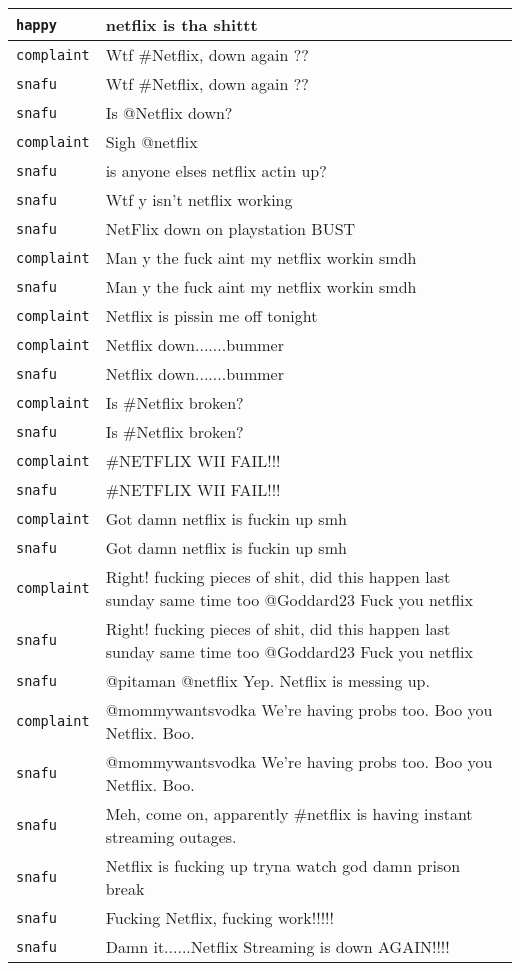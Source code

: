 \begin{center}
\begin{longtable}{|l|p{120mm}|}
         \texttt{happy} & netflix is tha shittt
      \tabularnewline\hline
         \texttt{complaint} & Wtf \#Netflix, down again ??
      \tabularnewline\hline
         \texttt{snafu} & Wtf \#Netflix, down again ??
      \tabularnewline\hline
         \texttt{snafu} & Is @Netflix down?
      \tabularnewline\hline
         \texttt{complaint} & Sigh @netflix
      \tabularnewline\hline
         \texttt{snafu} & is anyone elses netflix actin up?
      \tabularnewline\hline
         \texttt{snafu} & Wtf y isn't netflix working
      \tabularnewline\hline
         \texttt{snafu} & NetFlix down on playstation BUST
      \tabularnewline\hline
         \texttt{complaint} & Man y the fuck aint my netflix workin smdh
      \tabularnewline\hline
         \texttt{snafu} & Man y the fuck aint my netflix workin smdh
      \tabularnewline\hline
         \texttt{complaint} & Netflix is pissin me off tonight
      \tabularnewline\hline
         \texttt{complaint} & Netflix down.......bummer
      \tabularnewline\hline
         \texttt{snafu} & Netflix down.......bummer
      \tabularnewline\hline
         \texttt{complaint} & Is \#Netflix broken?
      \tabularnewline\hline
         \texttt{snafu} & Is \#Netflix broken?
      \tabularnewline\hline
         \texttt{complaint} & \#NETFLIX WII FAIL!!!
      \tabularnewline\hline
         \texttt{snafu} & \#NETFLIX WII FAIL!!!
      \tabularnewline\hline
         \texttt{complaint} & Got damn netflix is fuckin up smh
      \tabularnewline\hline
         \texttt{snafu} & Got damn netflix is fuckin up smh
      \tabularnewline\hline
         \texttt{complaint} & Right! fucking pieces of shit, did this happen last sunday same time too @Goddard23 Fuck you netflix
      \tabularnewline\hline
         \texttt{snafu} & Right! fucking pieces of shit, did this happen last sunday same time too @Goddard23 Fuck you netflix
      \tabularnewline\hline
         \texttt{snafu} & @pitaman @netflix Yep. Netflix is messing up.
      \tabularnewline\hline
         \texttt{complaint} & @mommywantsvodka We're having probs too. Boo you Netflix. Boo.
      \tabularnewline\hline
         \texttt{snafu} & @mommywantsvodka We're having probs too. Boo you Netflix. Boo.
      \tabularnewline\hline
         \texttt{snafu} & Meh, come on, apparently \#netflix is having instant streaming outages.
      \tabularnewline\hline
         \texttt{snafu} & Netflix is fucking up tryna watch god damn prison break
      \tabularnewline\hline
         \texttt{snafu} & Fucking Netflix, fucking work!!!!!
      \tabularnewline\hline
         \texttt{snafu} & Damn it......Netflix Streaming is down AGAIN!!!!

\end{longtable}
\end{center}
